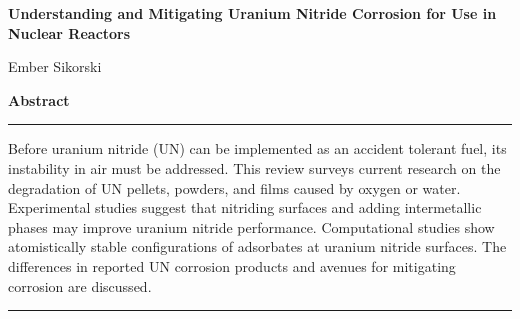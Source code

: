 \documentclass[11pt]{article}
\newcommand{\vs}{\vspace{2mm}}
\begin{document}
\begin{center}
\textbf{Understanding and Mitigating Uranium Nitride Corrosion for Use in Nuclear Reactors} \par \vs
Ember Sikorski  \par 
\textbf{Abstract}
\end{center}
\rule{6.5in}{0.1mm}
\vs \par 
Before uranium nitride (UN) can be implemented as an accident tolerant fuel, its instability in air must be addressed. This review surveys current research on the degradation of UN pellets, powders, and films caused by oxygen or water. Experimental studies suggest that nitriding surfaces and adding intermetallic phases may improve uranium nitride performance. Computational studies show atomistically stable configurations of adsorbates at uranium nitride surfaces. The differences in reported UN corrosion products and avenues for mitigating corrosion are discussed.
\\
\rule{6.5in}{0.1mm}	
\vs
\end{document}
